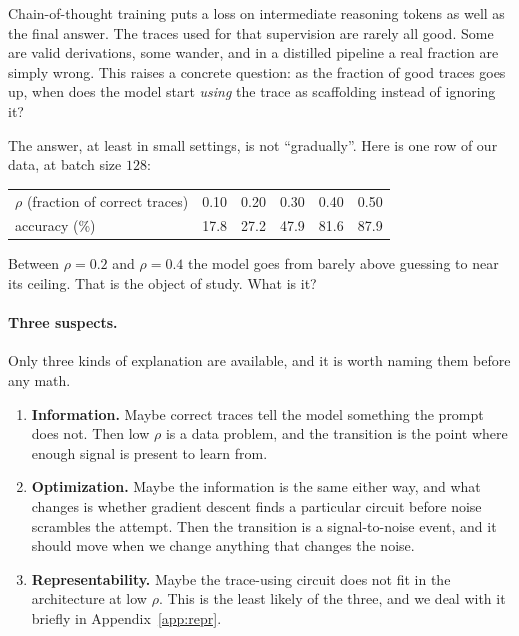 \documentclass{article}
\theoremstyle{plain}
\theoremstyle{definition}
\theoremstyle{remark}
\newcommand{\1}{\mathbf{1}}
\begin{document}
Chain-of-thought training puts a loss on intermediate reasoning tokens as well as
the final answer. The traces used for that supervision are rarely all good. Some
are valid derivations, some wander, and in a distilled pipeline a real fraction
are simply wrong. This raises a concrete question: as the fraction of good traces
goes up, when does the model start \emph{using} the trace as scaffolding instead
of ignoring it?

The answer, at least in small settings, is not ``gradually''. Here is one row of
our data, at batch size $128$:

\begin{center}
\begin{tabular}{lccccc}
\toprule
$\rho$ (fraction of correct traces) & 0.10 & 0.20 & 0.30 & 0.40 & 0.50\\
accuracy (\%) & 17.8 & 27.2 & 47.9 & 81.6 & 87.9\\
\bottomrule
\end{tabular}
\end{center}

Between $\rho=0.2$ and $\rho=0.4$ the model goes from barely above guessing to
near its ceiling. That is the object of study. What is it?

\paragraph{Three suspects.}
Only three kinds of explanation are available, and it is worth naming them before
any math.

\begin{enumerate}[leftmargin=*,itemsep=3pt]
\item \textbf{Information.} Maybe correct traces tell the model something the
prompt does not. Then low $\rho$ is a data problem, and the transition is the
point where enough signal is present to learn from.
\item \textbf{Optimization.} Maybe the information is the same either way, and
what changes is whether gradient descent finds a particular circuit before noise
scrambles the attempt. Then the transition is a signal-to-noise event, and it
should move when we change anything that changes the noise.
\item \textbf{Representability.} Maybe the trace-using circuit does not fit in the
architecture at low $\rho$. This is the least likely of the three, and we deal
with it briefly in Appendix~\ref{app:repr}.
\end{enumerate}
\end{document}
